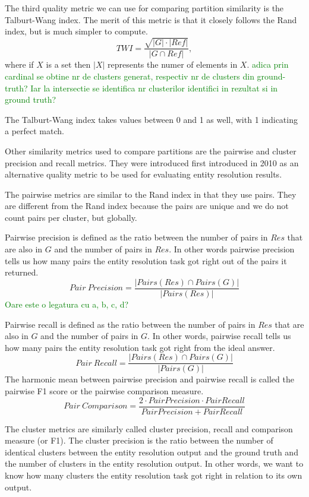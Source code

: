 \documentclass[lettersize,journal]{IEEEtran}
\begin{document}
    The third quality metric we can use for comparing partition similarity is
    the Talburt-Wang index.
    The merit of this metric is that it closely follows the Rand index, but is
    much simpler to compute\cite{Tal11}.
    \[
        TWI = \frac{\sqrt{|G|\cdot|Ref|}}{|G \cap Ref|},
    \]
    where if $X$ is a set then $|X|$ represents the numer of elements in $X$.
    \textcolor{green}{adica prin cardinal se obtine nr de clusters generat, respectiv nr de clusters din ground-truth? Iar la intersectie se identifica nr clusterilor identifici in rezultat si in ground truth?}

    The Talburt-Wang index takes values between 0 and 1 as well, with 1
    indicating a perfect match.

    Other similarity metrics used to compare partitions are the pairwise and
    cluster precision and recall metrics.
    They were introduced first introduced in 2010 as an alternative quality
    metric to be used for evaluating entity resolution results\cite{Men10}.

    The pairwise metrics are similar to the Rand index in that they use pairs.
    They are different from the Rand index because the pairs are unique and we
    do not count pairs per cluster, but globally.
    
    Pairwise precision is defined as the ratio between the number of pairs in
    $Res$ that are also in $G$ and the number of pairs in $Res$.
    In other words pairwise precision tells us how many pairs the entity
    resolution task got right out of the pairs it returned.
    \[
        Pair~Precision = \frac{|Pairs(Res) \cap Pairs(G)|}{|Pairs(Res)|}
    \]
    \textcolor{green}{Oare este o legatura cu a, b, c, d?}

    Pairwise recall is defined as the ratio between the number of pairs in
    $Res$ that are also in $G$ and the number of pairs in $G$.
    In other words, pairwise recall tells us how many pairs the entity
    resolution task got right from the ideal answer.
    \[
        Pair~Recall = \frac{|Pairs(Res) \cap Pairs(G)|}{|Pairs(G)|}
    \]
    The harmonic mean between pairwise precision and pairwise recall is called
    the pairwise F1 score or the pairwise comparison measure\cite{Men10}.
    \[
        Pair~Comparison = \frac{
            2 \cdot Pair Precision \cdot Pair Recall
        }{Pair Precision + Pair Recall}
    \]

    The cluster metrics are similarly called cluster precision, recall and
    comparison measure (or F1).
    The cluster precision is the ratio between the number of identical clusters
    between the entity resolution output and the ground truth and the number of
    clusters in the entity resolution output.
    In other words, we want to know how many clusters the entity resolution task
    got right in relation to its own output.
\end{document}
